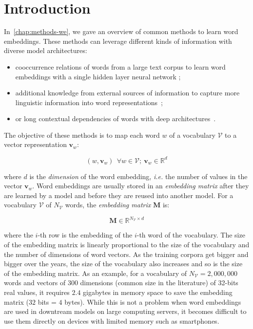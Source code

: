 \section{Introduction}
  In~\autoref{chap:methods-we}, we gave an overview of common methods to learn
  word embeddings. These methods can leverage different kinds of information
  with diverse model architectures:
  \begin{itemize}
    \item cooccurrence relations of words from a large text corpus to learn
      word embeddings with a single hidden layer neural network
      \citep{collobert2008unified, collobert2011natural,
      mikolov2013distributed};
    \item additional knowledge from external sources of information to capture
      more linguistic information into word
      representations~\citep{yudredze2014improving, kiela2015specializing,
      faruqui2015retrofitting};
    \item or long contextual dependencies of words with deep
      architectures~\citep{peters2018elmo, devlin2019bert}.
  \end{itemize}
  \noindent The objective of these methods is to map each word $w$ of a
  vocabulary $\mathcal{V}$ to a vector representation $\mathbf{v}_w$:

  \begin{equation}
    (w, \mathbf{v}_w)~~\forall w \in \mathcal{V};~\mathbf{v}_w \in \mathbb{R}^d
  \end{equation}

  \noindent where $d$ is the \textit{dimension} of the word embedding,
  \textit{i.e.} the number of values in the vector $\mathbf{v}_w$. Word
  embeddings are usually stored in an \textit{embedding matrix} after they are
  learned by a model and before they are reused into another model. For a
  vocabulary $\mathcal{V}$ of $N_{\mathcal{V}}$ words, the \textit{embedding
  matrix} $\mathbf{M}$ is:

  \begin{equation}
    \label{ch04:eq:embedding-matrix}
    \mathbf{M} \in \mathbb{R}^{N_\mathcal{V} \times d}
  \end{equation}

  \noindent where the $i$-th row is the embedding of the $i$-th word of the
  vocabulary. The size of the embedding matrix is linearly proportional to the
  size of the vocabulary and the number of dimensions of word vectors. As the
  training corpora get bigger and bigger over the years, the size of the
  vocabulary also increases and so is the size of the embedding matrix. As an
  example, for a vocabulary of $N_\mathcal{V} = 2,000,000$ words and vectors of
  $300$ dimensions (common size in the literature) of 32-bits real values, it
  requires $2.4$ gigabytes in memory space to save the embedding matrix ($32$
  bits = $4$ bytes). While this is not a problem when word embeddings are used
  in downtream models on large computing servers, it becomes difficult to use
  them directly on devices with limited memory such as smartphones.\medskip


